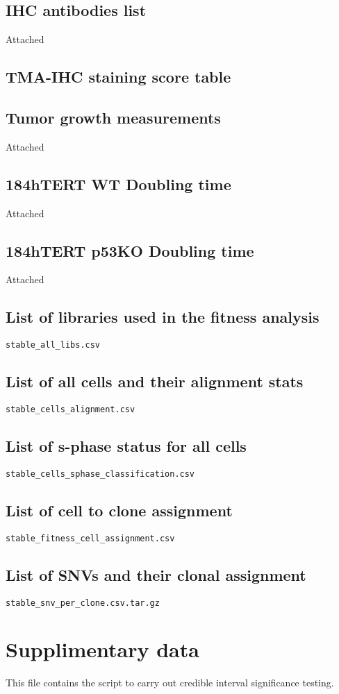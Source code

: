\documentclass{article}
\begin{document}
\subsection{IHC antibodies list}
Attached
\subsection{TMA-IHC staining score table}
\subsection{Tumor growth measurements}
Attached
\subsection{184hTERT WT Doubling time}
Attached
\subsection{184hTERT p53KO Doubling time}
Attached
\subsection{List of libraries used in the fitness analysis}
\texttt{stable\_all\_libs.csv}
\subsection{List of all cells and their alignment stats}
\texttt{stable\_cells\_alignment.csv}
\subsection{List of s-phase status for all cells} \texttt{stable\_cells\_sphase\_classification.csv} 
\subsection{List of cell to clone assignment} \texttt{stable\_fitness\_cell\_assignment.csv}
\subsection{List of SNVs and their clonal assignment} \texttt{stable\_snv\_per\_clone.csv.tar.gz}

\section{Supplimentary data}
This file contains the script to carry out credible interval   significance testing.
\end{document}
